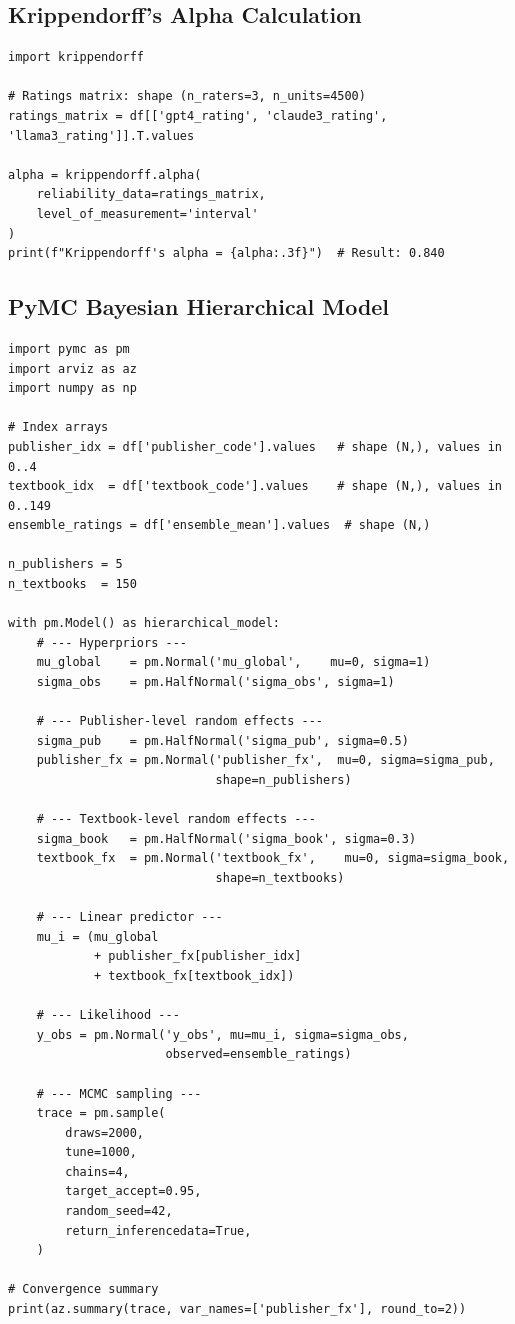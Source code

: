 \documentclass[10pt,letterpaper]{article}
\begin{document}
\subsection*{Krippendorff's Alpha Calculation}

\begin{lstlisting}[caption={Krippendorff's alpha computation (interval scale).},
  label={lst:kripp}]
import krippendorff

# Ratings matrix: shape (n_raters=3, n_units=4500)
ratings_matrix = df[['gpt4_rating', 'claude3_rating', 'llama3_rating']].T.values

alpha = krippendorff.alpha(
    reliability_data=ratings_matrix,
    level_of_measurement='interval'
)
print(f"Krippendorff's alpha = {alpha:.3f}")  # Result: 0.840
\end{lstlisting}

\subsection*{PyMC Bayesian Hierarchical Model}

\begin{lstlisting}[caption={Three-level Bayesian hierarchical model in PyMC.},
  label={lst:pymc}]
import pymc as pm
import arviz as az
import numpy as np

# Index arrays
publisher_idx = df['publisher_code'].values   # shape (N,), values in 0..4
textbook_idx  = df['textbook_code'].values    # shape (N,), values in 0..149
ensemble_ratings = df['ensemble_mean'].values  # shape (N,)

n_publishers = 5
n_textbooks  = 150

with pm.Model() as hierarchical_model:
    # --- Hyperpriors ---
    mu_global    = pm.Normal('mu_global',    mu=0, sigma=1)
    sigma_obs    = pm.HalfNormal('sigma_obs', sigma=1)

    # --- Publisher-level random effects ---
    sigma_pub    = pm.HalfNormal('sigma_pub', sigma=0.5)
    publisher_fx = pm.Normal('publisher_fx',  mu=0, sigma=sigma_pub,
                             shape=n_publishers)

    # --- Textbook-level random effects ---
    sigma_book   = pm.HalfNormal('sigma_book', sigma=0.3)
    textbook_fx  = pm.Normal('textbook_fx',    mu=0, sigma=sigma_book,
                             shape=n_textbooks)

    # --- Linear predictor ---
    mu_i = (mu_global
            + publisher_fx[publisher_idx]
            + textbook_fx[textbook_idx])

    # --- Likelihood ---
    y_obs = pm.Normal('y_obs', mu=mu_i, sigma=sigma_obs,
                      observed=ensemble_ratings)

    # --- MCMC sampling ---
    trace = pm.sample(
        draws=2000,
        tune=1000,
        chains=4,
        target_accept=0.95,
        random_seed=42,
        return_inferencedata=True,
    )

# Convergence summary
print(az.summary(trace, var_names=['publisher_fx'], round_to=2))
\end{lstlisting}
\end{document}

